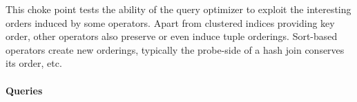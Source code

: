 
This choke point tests the ability of the query optimizer to exploit the interesting orders induced by some operators. Apart from clustered indices providing key order, other operators also preserve or even induce tuple orderings.
Sort-based operators create new orderings, typically the probe-side of a hash join conserves its order, etc.


\paragraph{Queries}
{\raggedright

}